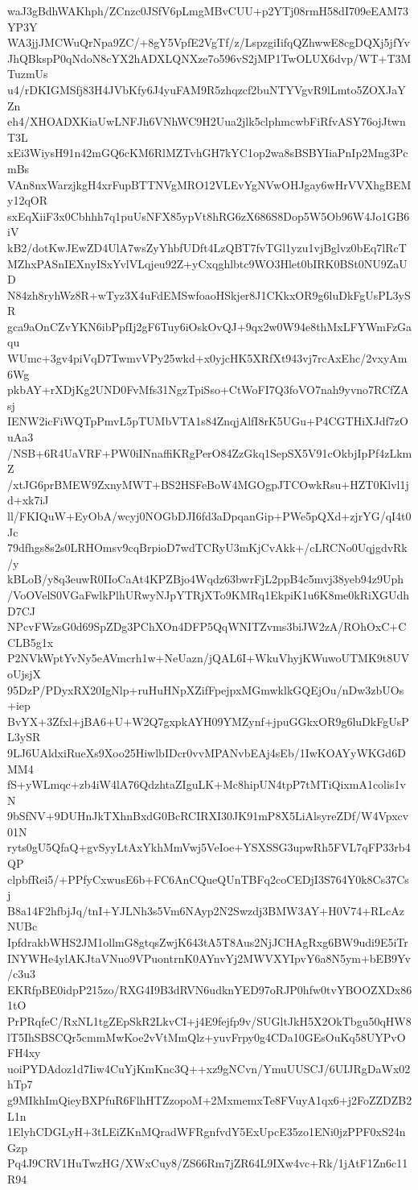waJ3gBdhWAKhph/ZCnzc0JSfV6pLmgMBvCUU+p2YTj08rmH58dI709eEAM73YP3Y
WA3jjJMCWuQrNpa9ZC/+8gY5VpfE2VgTf/z/LspzgiIifqQZhwwE8cgDQXj5jfYv
JhQBkspP0qNdoN8cYX2hADXLQNXze7o596vS2jMP1TwOLUX6dvp/WT+T3MTuzmUs
u4/rDKIGMSfj83H4JVbKfy6J4yuFAM9R5zhqzcf2buNTYVgvR9lLmto5ZOXJaYZn
eh4/XHOADXKiaUwLNFJh6VNhWC9H2Uua2jlk5clphmcwbFiRfvASY76ojJtwnT3L
xEi3WiysH91n42mGQ6cKM6RlMZTvhGH7kYC1op2wa8sBSBYIiaPnIp2Mng3PcmBs
VAn8nxWarzjkgH4xrFupBTTNVgMRO12VLEvYgNVwOHJgay6wHrVVXhgBEMy12qOR
sxEqXiiF3x0Cbhhh7q1puUsNFX85ypVt8hRG6zX686S8Dop5W5Ob96W4Jo1GB6iV
kB2/dotKwJEwZD4UlA7wsZyYhbfUDft4LzQBT7fvTGl1yzu1vjBglvz0bEq7lRcT
MZhxPASnIEXnyISxYvlVLqjeu92Z+yCxqghlbtc9WO3Hlet0bIRK0BSt0NU9ZaUD
N84zh8ryhWz8R+wTyz3X4uFdEMSwfoaoHSkjer8J1CKkxOR9g6luDkFgUsPL3ySR
gca9aOnCZvYKN6ibPpfIj2gF6Tuy6iOskOvQJ+9qx2w0W94e8thMxLFYWmFzGaqu
WUmc+3gv4piVqD7TwmvVPy25wkd+x0yjcHK5XRfXt943vj7rcAxEhc/2vxyAm6Wg
pkbAY+rXDjKg2UND0FvMfs31NgzTpiSso+CtWoFI7Q3foVO7nah9yvno7RCfZAsj
IENW2icFiWQTpPmvL5pTUMbVTA1s84ZnqjAlfI8rK5UGu+P4CGTHiXJdf7zOuAa3
/NSB+6R4UaVRF+PW0iINnaffiKRgPerO84ZzGkq1SepSX5V91cOkbjIpPf4zLkmZ
/xtJG6prBMEW9ZxnyMWT+BS2HSFeBoW4MGOgpJTCOwkRsu+HZT0Klvl1jd+xk7iJ
ll/FKIQuW+EyObA/wcyj0NOGbDJI6fd3aDpqanGip+PWe5pQXd+zjrYG/qI4t0Jc
79dfhgs8s2s0LRHOmsv9cqBrpioD7wdTCRyU3mKjCvAkk+/cLRCNo0UqjgdvRk/y
kBLoB/y8q3euwR0IIoCaAt4KPZBjo4Wqdz63bwrFjL2ppB4c5mvj38yeb94z9Uph
/VoOVelS0VGaFwlkPlhURwyNJpYTRjXTo9KMRq1EkpiK1u6K8me0kRiXGUdhD7CJ
NPcvFWzsG0d69SpZDg3PChXOn4DFP5QqWNITZvms3biJW2zA/ROhOxC+CCLB5g1x
P2NVkWptYvNy5eAVmcrh1w+NeUazn/jQAL6I+WkuVhyjKWuwoUTMK9t8UVoUjsjX
95DzP/PDyxRX20IgNlp+ruHuHNpXZifFpejpxMGmwklkGQEjOu/nDw3zbUOs+iep
BvYX+3Zfxl+jBA6+U+W2Q7gxpkAYH09YMZynf+jpuGGkxOR9g6luDkFgUsPL3ySR
9LJ6UAldxiRueXs9Xoo25HiwlbIDcr0vvMPANvbEAj4sEb/1IwKOAYyWKGd6DMM4
fS+yWLmqc+zb4iW4lA76QdzhtaZIguLK+Mc8hipUN4tpP7tMTiQixmA1colis1vN
9bSfNV+9DUHnJkTXhnBxdG0BcRCIRXI30JK91mP8X5LiAlsyreZDf/W4Vpxcv01N
ryts0gU5QfaQ+gvSyyLtAxYkhMmVwj5VeIoe+YSXSSG3upwRh5FVL7qFP33rb4QP
clpbfRei5/+PPfyCxwusE6b+FC6AnCQueQUnTBFq2coCEDjI3S764Y0k8Cs37Csj
B8a14F2hfbjJq/tnI+YJLNh3s5Vm6NAyp2N2Swzdj3BMW3AY+H0V74+RLcAzNUBc
IpfdrakbWHS2JM1ollmG8gtqsZwjK643tA5T8Aus2NjJCHAgRxg6BW9udi9E5iTr
INYWHe4ylAKJtaVNuo9VPuontrnK0AYnvYj2MWVXYIpvY6a8N5ym+bEB9Yv/c3u3
EKRfpBE0idpP215zo/RXG4I9B3dRVN6udknYED97oRJP0hfw0tvYBOOZXDx861tO
PrPRqfeC/RxNL1tgZEpSkR2LkvCI+j4E9fejfp9v/SUGltJkH5X2OkTbgu50qHW8
lT5IhSBSCQr5cmmMwKoe2vVtMmQlz+yuvFrpy0g4CDa10GEsOuKq58UYPvOFH4xy
uoiPYDAdoz1d7Iiw4CuYjKmKnc3Q++xz9gNCvn/YmuUUSCJ/6UIJRgDaWx02hTp7
g9MIkhImQieyBXPfuR6FlhHTZzopoM+2MxmemxTe8FVuyA1qx6+j2FoZZDZB2L1n
1ElyhCDGLyH+3tLEiZKnMQradWFRgnfvdY5ExUpcE35zo1ENi0jzPPF0xS24nGzp
Pq4J9CRV1HuTwzHG/XWxCuy8/ZS66Rm7jZR64L9IXw4vc+Rk/1jAtF1Zn6c11R94
